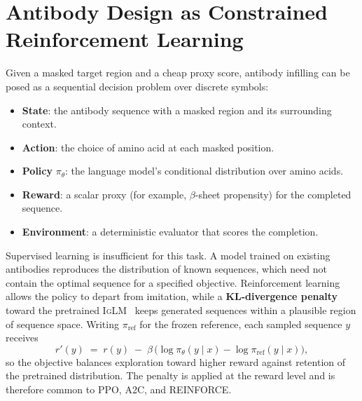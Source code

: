 \documentclass[11pt]{article}
\newcommand{\iglm}{\textsc{IgLM}}
\begin{document}
\section{Antibody Design as Constrained Reinforcement Learning}
Given a masked target region and a cheap proxy score, antibody infilling can be
posed as a sequential decision problem over discrete symbols:
\begin{itemize}[nosep]
  \item \textbf{State}: the antibody sequence with a masked region and its
  surrounding context.
  \item \textbf{Action}: the choice of amino acid at each masked position.
  \item \textbf{Policy} $\pi_\theta$: the language model's conditional
  distribution over amino acids.
  \item \textbf{Reward}: a scalar proxy (for example, $\beta$-sheet propensity)
  for the completed sequence.
  \item \textbf{Environment}: a deterministic evaluator that scores the
  completion.
\end{itemize}
Supervised learning is insufficient for this task. A model trained on existing
antibodies reproduces the distribution of known sequences, which need not contain
the optimal sequence for a specified objective. Reinforcement learning allows the
policy to depart from imitation, while a \textbf{KL-divergence penalty} toward the
pretrained \iglm~\cite{ziegler} keeps generated sequences within a plausible
region of sequence space. Writing $\pi_{\text{ref}}$ for the frozen reference,
each sampled sequence $y$ receives
\begin{equation}
  r'(y) \;=\; r(y) \;-\; \beta\,\big(\log \pi_\theta(y\mid x) - \log \pi_{\text{ref}}(y\mid x)\big),
  \label{eq:klreward}
\end{equation}
so the objective balances exploration toward higher reward against retention of
the pretrained distribution. The penalty is applied at the reward level and is
therefore common to PPO, A2C, and REINFORCE.
\end{document}
